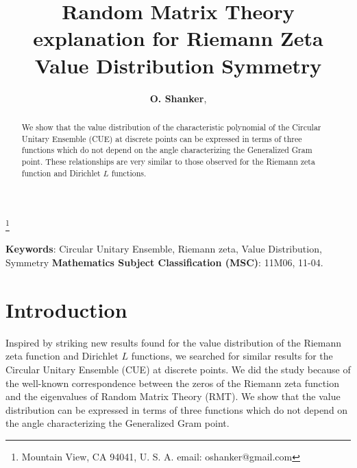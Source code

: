 \documentclass[twoside]{article}
\begin{document}


\newtheorem{theorem}{Theorem}[section]
\newtheorem{lemma}[theorem]{Lemma}

\theoremstyle{definition}
\newtheorem{definition}[theorem]{Definition}
\newtheorem{example}[theorem]{Example}
\newtheorem{xca}[theorem]{Exercise}

\theoremstyle{remark}
\newtheorem{remark}[theorem]{Remark}



\date{}
\lhead[]{}
\rhead[]{}

\title{\bf{Random Matrix Theory explanation for Riemann Zeta Value Distribution Symmetry}}

\maketitle


\author{{\textbf{O. Shanker}},}
\thanks{ Mountain View, CA 94041, U. S. A. email: oshanker@gmail.com}

\thispagestyle{fancy}

\begin{abstract}
We show that the value distribution 
of the characteristic polynomial of the Circular Unitary Ensemble (CUE) at discrete points
can be expressed in terms of three functions 
which do not depend on the angle characterizing the Generalized Gram point.
These relationships are very similar to those  observed for 
the Riemann zeta function and Dirichlet $L$ functions.
\end{abstract}
{\textbf {Keywords}:} Circular Unitary Ensemble, Riemann zeta, Value Distribution, Symmetry 
{\textbf {Mathematics Subject Classification (MSC)}:} 11M06, 11-04.


\symbolfootnote[0]{*}


\section{Introduction}

Inspired by striking new results found for the value distribution of the Riemann zeta function and Dirichlet $L$ functions,
we searched for similar results for the Circular Unitary Ensemble (CUE)
at discrete points. We did the study because of the well-known correspondence between the
zeros of the Riemann zeta function and the eigenvalues of Random Matrix Theory (RMT).
We show that the value distribution 
can be expressed in terms of three  functions 
which do not depend on the angle characterizing the Generalized Gram point. 
\end{document}
